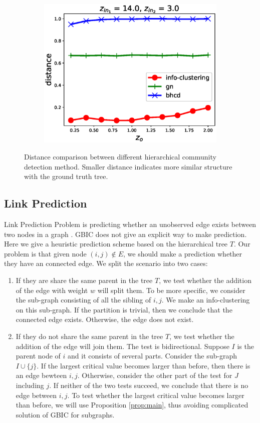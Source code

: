 \begin{figure}
\begin{subfigure}{0.33\textwidth}
		\includegraphics[width=\textwidth]{pic/z_o.eps}
		\caption{}
	\end{subfigure}
	\caption{Distance comparison between different hierarchical community detection method. Smaller distance indicates more similar structure with the ground truth tree.}\label{fig:cdr}	
\end{figure}
\subsection{Link Prediction}
Link Prediction Problem is predicting whether an unobserved edge exists between two nodes in a graph \citep{liben2007link}.  GBIC does not give an explicit way to make prediction. Here we give a heuristic prediction scheme based on the hierarchical tree $T$. Our problem is that given node $(i,j) \not\in E$, we should make a prediction whether they have an connected edge. We split the scenario 
into two cases:
\begin{enumerate}
\item If they are share the same parent in the tree $T$, we test whether the addition of the edge with weight $w$ will split them. To be more specific, we consider the sub-graph consisting of all the sibling of $i,j$. We make an info-clustering on this sub-graph. If the partition is trivial, then we conclude that the connected edge exists. Otherwise, the edge does not exist.

\item If they do not share the same parent in the tree $T$, we test whether the addition of the edge will join them. The test is bidirectional. Suppose $I$ is the parent node of $i$ and it consists of several parts. Consider the sub-graph $I \cup \{j\}$. If the largest critical value becomes larger than before, then there is an edge bewteen $i,j$. Otherwise, consider the other part of the test for $J$ including $j$. If neither of the two tests succeed, we conclude that there is no edge between $i,j$. To test whether the largest critical value becomes larger than before, we will use Proposition \ref{prop:main},  thus avoiding complicated solution of GBIC for subgraphs.
\end{enumerate}

